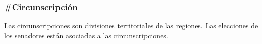 \subsubsection{\#Circunscripción}

Las circunscripciones son divisiones territoriales de las
regiones. Las elecciones de los senadores están asociadas a las
circunscripciones.

\begin{description}
  
\end{description}

